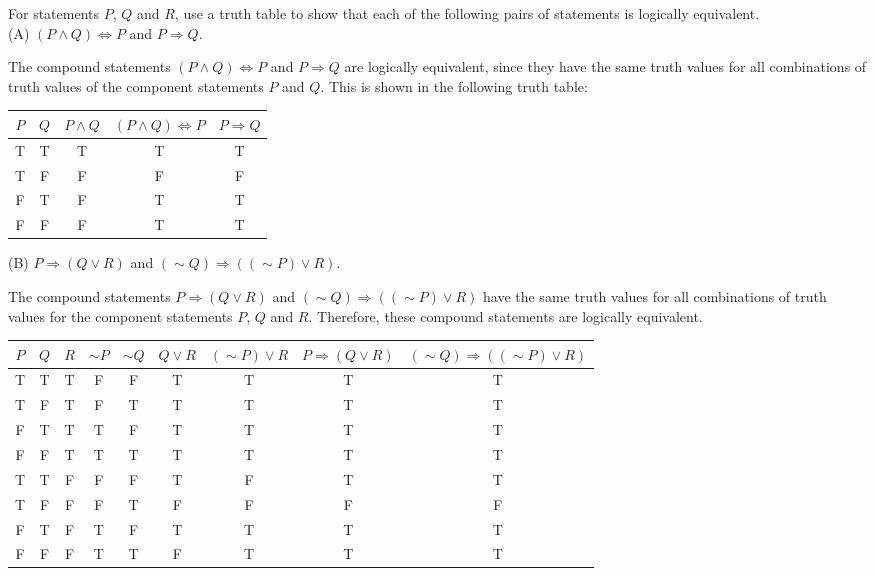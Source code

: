 \documentclass[12pt]{article}
\newenvironment{problem}[2][Problem]{\begin{trivlist}
		\item[\hskip \labelsep {\bfseries #1}\hskip \labelsep {\bfseries #2.}]}{\end{trivlist}}
\newenvironment{solution}[2][Solution]{\begin{trivlist}
		\item[\hskip \labelsep {\bfseries #1}\hskip \labelsep {\bfseries #2.}]}{\end{trivlist}}
\begin{document}
\begin{problem}{53}
	For statements $P$, $Q$ and $R$, use a truth table to show that each of the following pairs of statements is logically equivalent.\\
	
	(A) $(P \wedge Q) \Leftrightarrow P$ and $P \Rightarrow Q$.
	\begin{solution}{a}
		The compound statements $(P \wedge Q) \Leftrightarrow P$ and $P \Rightarrow Q$ are logically equivalent, since they have the same truth values for all combinations of truth values of the component statements $P$ and $Q.$ This is shown in the following truth table:
		\begin{center}
			\begin{tabular}{c c c c c}
			$P$ & $Q$ & $P \wedge Q$ & $(P \wedge Q) \Leftrightarrow P$ & $P \Rightarrow Q$\\
			\hline
			T & T & T & T & T\\
			T & F & F & F & F\\
			F & T & F & T & T\\
			F & F & F & T & T\\
			\hline
			\end{tabular}
		\end{center}
	\end{solution}
	
	(B) $P \Rightarrow (Q \vee R)$ and $(\sim Q) \Rightarrow ((\sim P)\vee R)$.
	\begin{solution}{b}
	The compound statements $P \Rightarrow (Q \vee R)$ and $(\sim Q) \Rightarrow ((\sim P)\vee R)$ have the same truth values for all combinations of truth values for the component statements $P$, $Q$ and $R$. Therefore, these compound statements are logically equivalent.
	\begin{center}
		\begin{tabular}{c| c| c| c| c| c| c| c| c}
			$P$ & $Q$ & $R$ & $\sim P$ & $\sim Q$ & $Q \vee R$ & $(\sim P)\vee R$ & $P \Rightarrow (Q\vee R)$ & $(\sim Q) \Rightarrow ((\sim P)\vee R)$\\
			\hline
			T & T & T & F & F & T & T & T & T\\
			T & F & T & F & T & T & T & T & T\\
			F & T & T & T & F & T & T & T & T\\
			F & F & T & T & T & T & T & T & T\\
			T & T & F & F & F & T & F & T & T\\
			T & F & F & F & T & F & F & F & F\\
			F & T & F & T & F & T & T & T & T\\
			F & F & F & T & T & F & T & T & T\\
			\hline
		\end{tabular}
	\end{center}
	\end{solution}
\end{problem}
\end{document}
